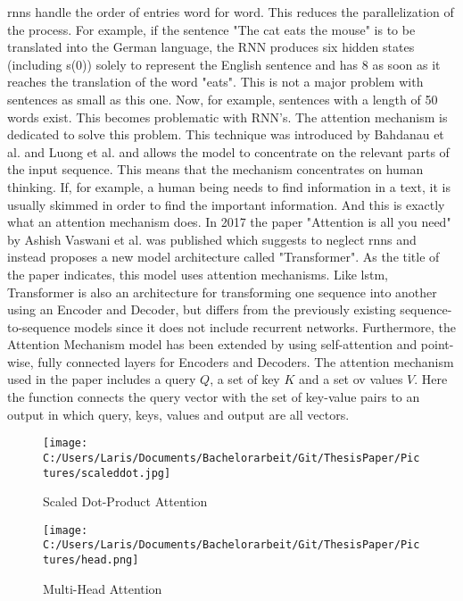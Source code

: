 \documentclass[a4paper, 11pt,titlepage,oneside,openany]{book}
\begin{document}
\noindent \gls{rnn}s handle the order of entries word for word. This reduces the parallelization of the process. For example, if the sentence "The cat eats the mouse" is to be translated into the German language, the RNN produces six hidden states (including s(0)) solely to represent the English sentence and has 8 as soon as it reaches the translation of the word "eats". This is not a major problem with sentences as small as this one. Now, for example, sentences with a length of 50 words exist. This becomes problematic with RNN's. The attention mechanism is dedicated to solve this problem. This technique was introduced by Bahdanau et al. \cite{bahdnau} and Luong et al. \cite{lunong} and allows the model to concentrate on the relevant parts of the input sequence. This means that the mechanism concentrates on human thinking. If, for example, a human being needs to find information in a text, it is usually skimmed in order to find the important information. And this is exactly what an attention mechanism does. 
\newpage
In 2017 the paper "Attention is all you need" by Ashish Vaswani et al.  \cite{attention} was published which suggests to neglect \gls{rnn}s and instead proposes a new model architecture called "Transformer". As the title of the paper indicates, this model uses attention mechanisms. Like \gls{lstm}, Transformer is also an architecture for transforming one sequence into another using an Encoder and Decoder, but differs from the previously existing sequence-to-sequence models since it does not include recurrent networks. Furthermore, the Attention Mechanism model has been extended by using self-attention and point-wise, fully connected layers for Encoders and Decoders.
The attention mechanism used in the paper includes a query $Q$, a set of key $K$ and a set ov values $V$. Here the function connects the query vector with the set of key-value pairs to an output in which query, keys, values and output are all vectors.\\
\begin{figure}[t]
	\begin{minipage}[b]{0.5\linewidth}
		\texttt{[image: C:/Users/Laris/Documents/Bachelorarbeit/Git/ThesisPaper/Pictures/scaleddot.jpg]}
		\caption{Scaled Dot-Product Attention}
	\end{minipage}
	\hfill
	\begin{minipage}[b]{0.5\linewidth}
		\texttt{[image: C:/Users/Laris/Documents/Bachelorarbeit/Git/ThesisPaper/Pictures/head.png]}
		\caption{Multi-Head Attention}
	\end{minipage}
\end{figure}
\end{document}
